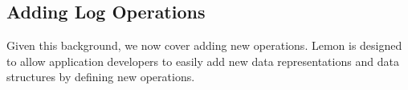 \documentclass[letterpaper,twocolumn,english]{article}
\newcommand{\yad}{Lemon\xspace}
\begin{document}





\subsection{Adding Log Operations}
\label{op-def}


Given this background, we now cover adding new operations. \yad is
designed to allow application developers to easily add new data
representations and data structures by defining new operations.
\end{document}
